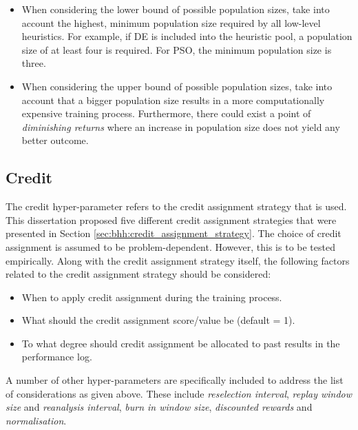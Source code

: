 \begin{itemize}
      \item When considering the lower bound of possible population sizes, take into account the highest, minimum population size required by all low-level heuristics. For example, if \Acs{DE} is included into the heuristic pool, a population size of at least four is required. For \acs{PSO}, the minimum population size is three.

      \item When considering the upper bound of possible population sizes, take into account that a bigger population size results in a more computationally expensive training process. Furthermore, there could exist a point of \textit{diminishing returns} where an increase in population size does not yield any better outcome.
\end{itemize}

\subsection{Credit}\label{sec:bhh:hyper_parameters:credit}

The credit hyper-parameter refers to the credit assignment strategy that is used. This dissertation proposed five different credit assignment strategies that were presented in Section \ref{sec:bhh:credit_assignment_strategy}. The choice of credit assignment is assumed to be problem-dependent. However, this is to be tested empirically. Along with the credit assignment strategy itself, the following factors related to the credit assignment strategy should be considered:

\begin{itemize}
      \item When to apply credit assignment during the training process.
      \item What should the credit assignment score/value be (default = 1).
      \item To what degree should credit assignment be allocated to past results in the performance log.
\end{itemize}

A number of other hyper-parameters are specifically included to address the list of considerations as given above. These include \textit{reselection interval}, \textit{replay window size} and \textit{reanalysis interval}, \textit{burn in window size}, \textit{discounted rewards} and \textit{normalisation}.

